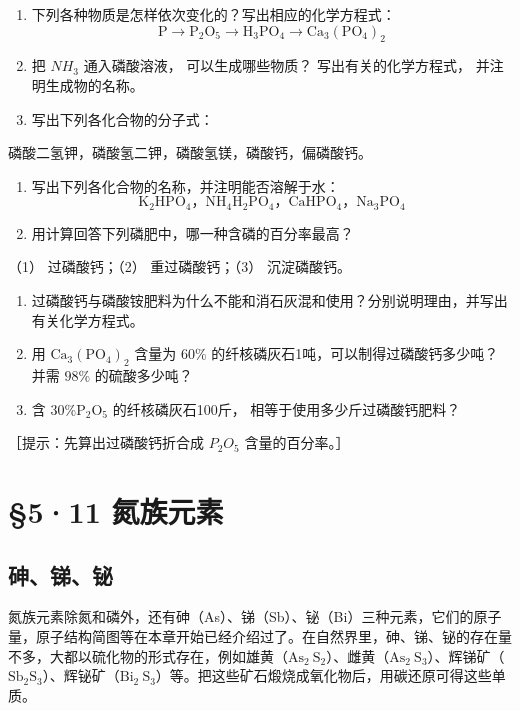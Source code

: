 \begin{enumerate}
\item
  下列各种物质是怎样依次变化的？写出相应的化学方程式：
\[
\mathrm{P} \longrightarrow \mathrm{P} _ {2} \mathrm{O} _ {5} \longrightarrow \mathrm{H} _ {3} \mathrm{PO} _ {4} \longrightarrow \mathrm{Ca} _ {3} (\mathrm{PO} _ {4}) _ {2}
\]
\item
  把 \(NH_{3}\) 通入磷酸溶液， 可以生成哪些物质？ 写出有关的化学方程式，
  并注明生成物的名称。
\item
  写出下列各化合物的分子式：
\end{enumerate}

磷酸二氢钾，磷酸氢二钾，磷酸氢镁，磷酸钙，偏磷酸钙。

\begin{enumerate}[start=4]
\item
  写出下列各化合物的名称，并注明能否溶解于水：
\[
\mathrm{K} _ {2} \mathrm{HPO} _ {4}\text{，} \mathrm{NH} _ {4} \mathrm{H} _ {2} \mathrm{PO} _ {4}\text{，} \mathrm{CaHPO} _ {4}\text{，} \mathrm{Na} _ {3} \mathrm{PO} _ {4}
\]
\item
  用计算回答下列磷肥中，哪一种含磷的百分率最高？
\end{enumerate}

（1） 过磷酸钙；（2） 重过磷酸钙；（3） 沉淀磷酸钙。

\begin{enumerate}[start=6]
\item
  过磷酸钙与磷酸铵肥料为什么不能和消石灰混和使用？分别说明理由，并写出有关化学方程式。
\item
  用 \(\mathrm{Ca}_{3}(\mathrm{PO}_{4})_{2}\) 含量为 \(60\%\)
  的纤核磷灰石1吨，可以制得过磷酸钙多少吨？并需 \(98\%\) 的硫酸多少吨？
\item
  含 \(30\% \mathrm{P}_{2} \mathrm{O}_{5}\) 的纤核磷灰石100斤，
  相等于使用多少斤过磷酸钙肥料？
\end{enumerate}

［提示：先算出过磷酸钙折合成 \(P_{2}O_{5}\) 含量的百分率。］

\section{§5·11 氮族元素}

\subsection{砷、锑、铋}

氮族元素除氮和磷外，还有砷（As）、锑（Sb）、铋（Bi）三种元素，它们的原子量，原子结构简图等在本章开始已经介绍过了。在自然界里，砷、锑、铋的存在量不多，大都以硫化物的形式存在，例如雄黄（\(\mathrm{As}_{2} \mathrm{~S}_{2}\)）、雌黄（\(\mathrm{As}_{2} \mathrm{~S}_{3}\)）、辉锑矿（\(\mathrm{Sb}_{2}\mathrm{S}_{3}\)）、辉铋矿（\(\mathrm{Bi}_{2} \mathrm{~S}_{3}\)）等。把这些矿石煅烧成氧化物后，用碳还原可得这些单质。

